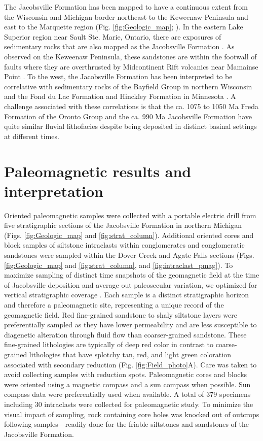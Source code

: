 \documentclass[draft]{agujournal2019}
\begin{document}
The Jacobsville Formation has been mapped to have a continuous extent from the Wisconsin and Michigan border northeast to the Keweenaw Peninsula and east to the Marquette region (Fig. \ref{fig:Geologic_map}; ). In the eastern Lake Superior region near Sault Ste. Marie, Ontario, there are exposures of sedimentary rocks that are also mapped as the Jacobsville Formation \cite{Hamblin1958a}. As observed on the Keweenaw Peninsula, these sandstones are within the footwall of faults where they are overthrusted by Midcontinent Rift volcanics near Mamainse Point \cite{Manson1994a}. To the west, the Jacobsville Formation has been interpreted to be correlative with sedimentary rocks of the Bayfield Group in northern Wisconsin and the Fond du Lac Formation and Hinckley Formation in Minnesota \cite{Thwaites1912a, Hamblin1958a, Wallace1971a, Kalliokoski1982a, Ojakangas2001b}. A challenge associated with these correlations is that the ca. 1075 to 1050 Ma Freda Formation of the Oronto Group and the ca. 990 Ma Jacobsville Formation have quite similar fluvial lithofacies despite being deposited in distinct basinal settings at different times.

\section*{Paleomagnetic results and interpretation}

Oriented paleomagnetic samples were collected with a portable electric drill from five stratigraphic sections of the Jacobsville Formation in northern Michigan (Figs. \ref{fig:Geologic_map} and \ref{fig:strat_column}). Additional oriented cores and block samples of siltstone intraclasts within conglomerates and conglomeratic sandstones were sampled within the Dover Creek and Agate Falls sections (Figs. \ref{fig:Geologic_map} and \ref{fig:strat_column}, and \ref{fig:intraclast_pmag}). To maximize sampling of distinct time snapshots of the geomagnetic field at the time of Jacobsville deposition and average out paleosecular variation, we optimized for vertical stratigraphic coverage \cite{Sapienza2023a}. Each sample is a distinct stratigraphic horizon and therefore a paleomagnetic site, representing a unique record of the geomagnetic field. Red fine-grained sandstone to shaly siltstone layers were preferentially sampled as they have lower permeability and are less susceptible to diagenetic alteration through fluid flow than coarser-grained sandstone. These fine-grained lithologies are typically of deep red color in contrast to coarse-grained lithologies that have splotchy tan, red, and light green coloration associated with secondary reduction (Fig. \ref{fig:Field_photo}A). Care was taken to avoid collecting samples with reduction spots. Paleomagnetic cores and blocks were oriented using a magnetic compass and a sun compass when possible. Sun compass data were preferentially used when available. A total of 379 specimens including 30 intraclasts were collected for paleomagnetic study. To minimize the visual impact of sampling, rock containing core holes was knocked out of outcrops following samples---readily done for the friable siltstones and sandstones of the Jacobsville Formation.
\end{document}
